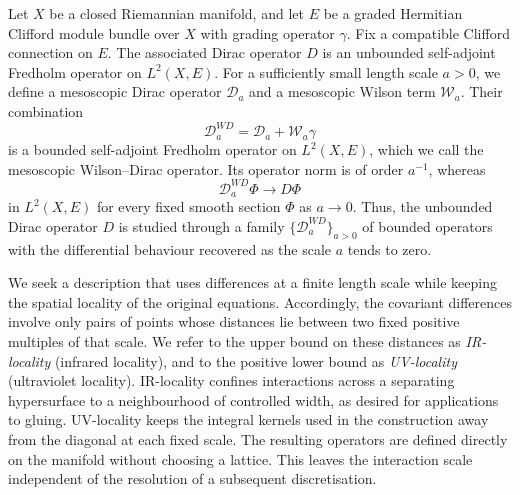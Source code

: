 \documentclass[a4paper,oneside,12pt]{amsart}
\theoremstyle{plain}
\theoremstyle{definition}
\theoremstyle{remark}
\newcommand{\mesoscopicDiracoperator}[1][a]{\mathcal{D}_{#1}}
\newcommand{\mesoscopicWilsonterm}[1][a]{\mathcal{W}_{#1}}
\newcommand{\mesoscopicWilsonDiracoperator}[1][a]{\mathcal{D}_{#1}^{\mathit{WD}}}
\begin{document}
Let $X$ be a closed Riemannian manifold, and let $E$ be a graded Hermitian Clifford module bundle over $X$ with grading operator $\gamma$.
Fix a compatible Clifford connection on $E$.
The associated Dirac operator $D$ is an unbounded self-adjoint Fredholm operator on $L^2(X,E)$.
For a sufficiently small length scale $a>0$, we define a mesoscopic Dirac operator $\mesoscopicDiracoperator$ and a mesoscopic Wilson term $\mesoscopicWilsonterm$.
Their combination
\begin{equation}
  \mesoscopicWilsonDiracoperator = \mesoscopicDiracoperator + \mesoscopicWilsonterm\gamma
\end{equation}
is a bounded self-adjoint Fredholm operator on $L^2(X,E)$, which we call the mesoscopic Wilson--Dirac operator.
Its operator norm is of order $a^{-1}$, whereas
\begin{equation}
  \mesoscopicWilsonDiracoperator \Phi \longrightarrow D\Phi
\end{equation}
in $L^2(X,E)$ for every fixed smooth section $\Phi$ as $a \to 0$.
Thus, the unbounded Dirac operator $D$ is studied through a family $\{\mesoscopicWilsonDiracoperator\}_{a > 0}$ of bounded operators with the differential behaviour recovered as the scale $a$ tends to zero.

We seek a description that uses differences at a finite length scale while keeping the spatial locality of the original equations.
Accordingly, the covariant differences involve only pairs of points whose distances lie between two fixed positive multiples of that scale.
We refer to the upper bound on these distances as \emph{IR-locality} (infrared locality), and to the positive lower bound as \emph{UV-locality} (ultraviolet locality).
IR-locality confines interactions across a separating hypersurface to a neighbourhood of controlled width, as desired for applications to gluing.
UV-locality keeps the integral kernels used in the construction away from the diagonal at each fixed scale.
The resulting operators are defined directly on the manifold without choosing a lattice.
This leaves the interaction scale independent of the resolution of a subsequent discretisation.
\end{document}
